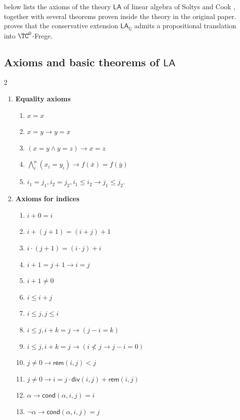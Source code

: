 \documentclass[11pt]{article}
\newcommand{\LA}{\mathsf{LA}}
\newcommand{\LAQ}{\mathsf{LA}_\mathbb{Q}}
\theoremstyle{definition}
\theoremstyle{plain}
\theoremstyle{remark}
\begin{document}
 below lists the axioms of the theory $\LA$ of linear algebra of Soltys and Cook \cite{cooksoltys}, together with several theorems proven inside the theory in the original paper.  proves that the conservative extension $\LAQ$ admits a propositional translation into $\TC^0$-Frege.

\subsection{Axioms and basic theorems of $\LA$}
\label{app:LA-axioms}
\begin{multicols}{2}
\begin{enumerate}
    \item \textbf{Equality axioms}
    \begin{enumerate}
        \item $x=x$
        \item $x = y \rightarrow y = x$
        \item $(x=y \land y=z) \rightarrow x=z$
        \item $\bigwedge_{i}^n (x_i = y_i) \to f(\bar x)=f(\bar y)$
        \item $i_1=j_1, i_2=j_2, i_1\leq i_2\rightarrow j_1\leq j_2$.
    \end{enumerate}
    \item \textbf{Axioms for indices}
    \begin{enumerate} 
        \item $i+0=i$ 
        \item $ i+(j+1)=(i+j)+1$
        \item $ i\cdot(j+1)=(i\cdot j)+i$
        \item $i+1=j+1 \to i=j$
        \item $ i+1\neq 0$
        \item $ i \leq i+j$
        \item $ i\leq j, j\leq i$
        \item $i\leq j, i+k=j\to (j-i=k)$
        \item $i\leq j, i+k=j \to (i \nless j \to j-i=0)$
        \item $j \neq 0 \to \mathsf{rem}(i, j) < j$
        \item $j \neq 0 \to i = j \cdot \mathsf{div}(i,j) + \mathsf{rem}(i, j)$
        \item $\alpha \to \mathsf{cond}(\alpha, i, j)=i$
        \item $\neg \alpha\to \mathsf{cond}(\alpha, i, j)=j$
    \end{enumerate}

\end{enumerate}
\end{multicols}
\end{document}
